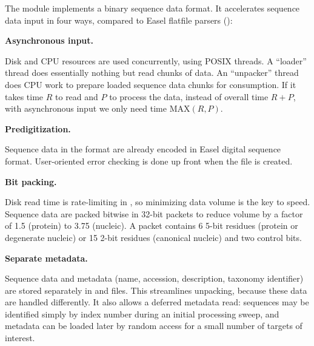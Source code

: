The  module implements a binary sequence data
format. It accelerates sequence data input in four ways, compared to
Easel flatfile parsers ():

\begin{description}

\item{ \textbf{ Asynchronous input. }}

   Disk and CPU resources are used concurrently, using POSIX threads.
   A ``loader'' thread does essentially nothing but read chunks of
   data.  An ``unpacker'' thread does CPU work to prepare loaded
   sequence data chunks for consumption. If it takes time $R$ to read
   and $P$ to process the data, instead of overall time $R+P$, with
   asynchronous input we only need time $\mathrm{MAX}(R,P)$.

\item{ \textbf{ Predigitization. }}

  Sequence data in the  format are already encoded in
  Easel digital sequence format.  User-oriented error checking is done
  up front when the  file is created. 
                                                                     
\item{ \textbf{ Bit packing. }}
                                                                     
  Disk read time is rate-limiting in , so minimizing
  data volume is the key to speed.  Sequence data are packed bitwise
  in 32-bit packets to reduce volume by a factor of 1.5 (protein) to
  3.75 (nucleic). A packet contains 6 5-bit residues (protein or
  degenerate nucleic) or 15 2-bit residues (canonical nucleic) and two
  control bits.  
                                                                     
\item{ \textbf{ Separate metadata. }}
                                                                     
  Sequence data and metadata (name, accession, description, taxonomy
  identifier) are stored separately in  and 
  files. This streamlines unpacking, because these data are handled
  differently.  It also allows a deferred metadata read: sequences may
  be identified simply by index number during an initial processing
  sweep, and metadata can be loaded later by random access for a small
  number of targets of interest.

\end{description}


